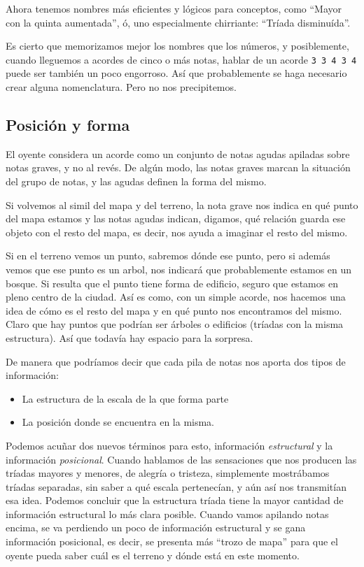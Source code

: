 \documentclass[]{article}
\providecommand{\tightlist}{%
  \setlength{
\itemsep}{0pt}\setlength{\parskip}{0pt}}
\begin{document}
Ahora tenemos nombres más eficientes y lógicos para conceptos, como ``Mayor con la quinta aumentada'', ó, uno especialmente chirriante: ``Tríada disminuída''.

Es cierto que memorizamos mejor los nombres que los números, y posiblemente, cuando lleguemos a acordes de cinco o más notas, hablar de un acorde \texttt{3\ 3\ 4\ 3\ 4} puede ser también un poco engorroso. Así que probablemente se haga necesario crear alguna nomenclatura. Pero no nos precipitemos.

\subsection{Posición y forma}

El oyente considera un acorde como un conjunto de notas agudas apiladas sobre notas graves, y no al revés. De algún modo, las notas graves marcan la situación del grupo de notas, y las agudas definen la forma del mismo.

Si volvemos al simil del mapa y del terreno, la nota grave nos indica en qué punto del mapa estamos y las notas agudas indican, digamos, qué relación guarda ese objeto con el resto del mapa, es decir, nos ayuda a imaginar el resto del mismo.

Si en el terreno vemos un punto, sabremos dónde ese punto, pero si además vemos que ese punto es un arbol, nos indicará que probablemente estamos en un bosque. Si resulta que el punto tiene forma de edificio, seguro que estamos en pleno centro de la ciudad. Así es como, con un simple acorde, nos hacemos una idea de cómo es el resto del mapa y en qué punto nos encontramos del mismo. Claro que hay puntos que podrían ser árboles o edificios (tríadas con la misma estructura). Así que todavía hay espacio para la sorpresa.

De manera que podríamos decir que cada pila de notas nos aporta dos tipos de información:

\begin{itemize}   \tightlist
  \item La estructura de la escala de la que forma parte
  \item La posición donde se encuentra en la misma.
\end{itemize}

Podemos acuñar dos nuevos términos para esto, información \emph{estructural} y la información \emph{posicional}. Cuando hablamos de las sensaciones que nos producen las tríadas mayores y menores, de alegría o tristeza, simplemente mostrábamos tríadas separadas, sin saber a qué escala pertenecían, y aún así nos transmitían esa idea. Podemos concluir que la estructura tríada tiene la mayor cantidad de información estructural lo más clara posible. Cuando vamos apilando notas encima, se va perdiendo un poco de información estructural y se gana información posicional, es decir, se presenta más ``trozo de mapa'' para que el oyente pueda saber cuál es el terreno y dónde está en este momento.
\end{document}
